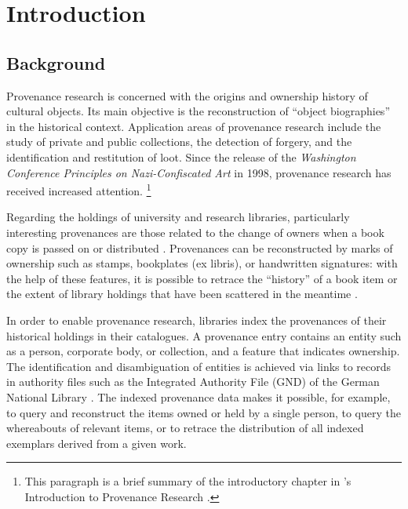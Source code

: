 \chapter{Introduction}
\label{chap:intro}

\section{Background}
\label{sec:background}

Provenance research is concerned with the origins and ownership history
of cultural objects. Its main objective is the reconstruction of
\enquote{object biographies} in the historical context.
Application areas of provenance research include
the study of private and public collections,
the detection of forgery,
and the identification and restitution of loot.
Since the release of the
\emph{Washington Conference Principles on Nazi-Confiscated Art} \autocite{WashingtonPrinciples}
in 1998,
provenance research has received increased attention.%
\footnote{%
  This paragraph is a brief summary of the introductory chapter in \citeauthor{Zuschlag2022}'s
  Introduction to Provenance Research \autocite*[Chapter 1]{Zuschlag2022}.%
}

Regarding the holdings of university and research libraries,
particularly interesting provenances are those related to the change of
owners when a book copy is passed on or distributed \autocite[p.\,2]{Hakelberg2016}.
Provenances can be reconstructed by marks of ownership
such as stamps, bookplates (ex libris), or handwritten signatures:
with the help of these features, it is possible to retrace
the \enquote{history} of a book item
or the extent of library holdings that have been scattered in the meantime \autocite[p.\,2]{Hakelberg2016}.

In order to enable provenance research,
libraries index the provenances of their historical holdings
in their catalogues.
A provenance entry contains an entity such as a person, corporate body, or collection,
and a feature that indicates ownership.
The identification and disambiguation of entities
is achieved via links to records in authority files such as the
Integrated Authority File (GND) of the German National Library \autocite{GND}.
The indexed provenance data makes it possible, for example,
to query and reconstruct the items owned or held by a single person,
to query the whereabouts of relevant items,
or to retrace the distribution of all indexed exemplars derived from a given work.

